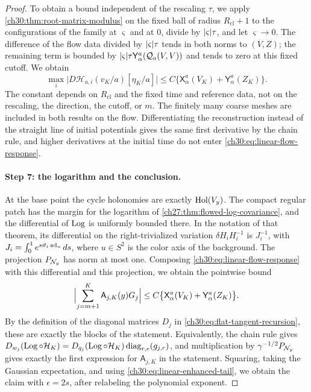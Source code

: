\begin{proof}
To obtain a bound independent of the rescaling $\tau$, we apply \cref{ch30:thm:root-matrix-modulus} on the fixed ball of radius $R_{\mathrm{cl}}+1$ to the configurations of the family at $\varsigma$ and at $0$, divide by $\lvert \varsigma\rvert\tau$, and let $\varsigma\to0$. The difference of the flow data divided by $\lvert \varsigma\rvert\tau$ tends in both norms to $(V,Z)$; the remaining term is bounded by $\lvert \varsigma\rvert\tau\mathsf Y_\alpha^a(\mathcal Q_{a}(V,V))$ and tends to zero at this fixed cutoff. We obtain
\begin{equation}\label{ch30:eq:linear-flow-response}
 \max_i\bigl\lvert D\mathscr H_{a,i}(v_K/a)[\eta_K/a]\bigr\rvert\le C\bigl\{\mathsf X_\alpha^a(V_K)+\mathsf Y_\alpha^a(Z_K)\bigr\}.
\end{equation}
The constant depends on $R_{\mathrm{cl}}$ and the fixed time and reference data, not on the rescaling, the direction, the cutoff, or $m$. The finitely many coarse meshes are included in both results on the flow. Differentiating the reconstruction instead of the straight line of initial potentials gives the same first derivative by the chain rule, and higher derivatives at the initial time do not enter \eqref{ch30:eq:linear-flow-response}.

\paragraph{Step 7: the logarithm and the conclusion.} At the base point the cycle holonomies are exactly $\operatorname{Hol}(V_y)$. The compact regular patch has the margin for the logarithm of \cref{ch27:thm:flowed-log-covariance}, and the differential of $\operatorname{Log}$ is uniformly bounded there. In the notation of that theorem, its differential on the right-trivialized variation $\delta H_iH_i^{-1}$ is $J_i^{-1}$, with $J_i=\int_0^1e^{s\vartheta_i\operatorname{ad}_u}\,ds$, where $u\in S^2$ is the color axis of the background. The projection $P_{\mathcal N_{y}}$ has norm at most one. Composing \eqref{ch30:eq:linear-flow-response} with this differential and this projection, we obtain the pointwise bound
\[
 \Bigl\lvert\sum_{j=m+1}^K\mathsf A_{j,K}(y)G_j\Bigr\rvert\le C\bigl\{\mathsf X_\alpha^a(V_K)+\mathsf Y_\alpha^a(Z_K)\bigr\}.
\]
By the definition of the diagonal matrices $D_j$ in \eqref{ch30:eq:flat-tangent-recursion}, these are exactly the blocks of the statement. Equivalently, the chain rule gives $D_{w_j}(\operatorname{Log}\circ\mathcal H_K)=D_{q_j}(\operatorname{Log}\circ\mathcal H_K)\operatorname{diag}_{r,e}(g_{j,r})$, and multiplication by $\gamma^{-1/2}P_{\mathcal N_{y}}$ gives exactly the first expression for $\mathsf A_{j,K}$ in the statement. Squaring, taking the Gaussian expectation, and using \eqref{ch30:eq:linear-enhanced-tail}, we obtain the claim with $\epsilon=2s$, after relabeling the polynomial exponent.


\end{proof}
